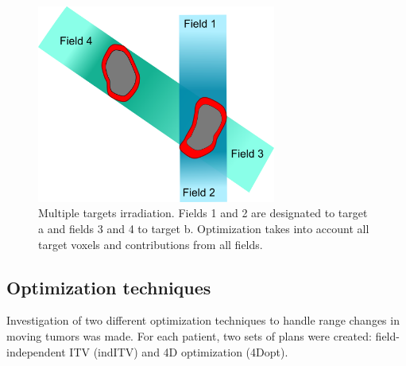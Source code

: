 \newpage


\begin{figure}[H]
	\begin{center}
		\includegraphics[width=0.7\textwidth]{./ComplexPatients/Images/multiTarget.png}
		\caption{Multiple targets irradiation. Fields 1 and 2 are designated to target a and fields 3 and 4 to target b. Optimization takes into account all target voxels and contributions from all fields.}
		\label{Fig:multiTargets}
	\end{center}
\end{figure}



\subsection{Optimization techniques}

Investigation of two different optimization techniques to handle range changes in moving tumors was made. For each patient, two sets of plans were created: field-independent ITV (indITV) and 4D optimization (4Dopt). 

